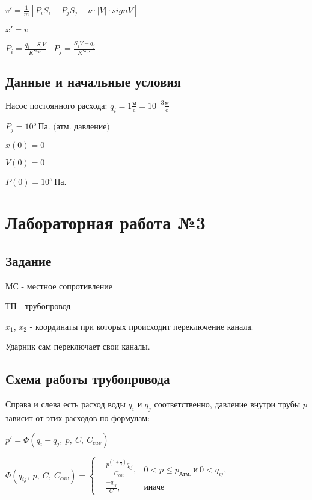 \documentclass[12pt, a4paper]{article}
\begin{document}
$ v' = \frac{1}{m}[P_i S_i - P_j S_j - \nu \cdot |V| \cdot sign V] $

$ x' = v $

$ P_i = \frac{q_i - S_i V}{K^{\text{Упр.}}} \> \> \> \> P_j = \frac{S_j V - q_j}{K^{\text{Упр.}}}$


\subsection{Данные и начальные условия}

$\text{Насос постоянного расхода: } q_i = 1 \frac{\text{м}}{\text{c}} = 10^{-3} \frac{\text{м}}{\text{c}}$

$P_j = 10^5\, \text{Па. (атм. давление)}$

$ x(0) = 0$

$ V(0) = 0$

$ P(0) = 10^5\, \text{Па.} $


\section{Лабораторная работа №3}

\subsection{Задание}

МС - местное сопротивление

ТП - трубопровод

$x_1$, $x_2$ - координаты при которых происходит переключение канала.

Ударник сам переключает свои каналы.

\subsection{Схема работы трубопровода}

Справа и слева есть расход воды $q_i$ и $q_j$ соответственно, давление внутри трубы $p$ зависит от этих расходов по формулам:

$ p' = \Phi(q_i - q_j,\ p,\ C,\ C_{cav}) $

$
\Phi(q_{ij},\ p,\ C,\ C_{cav}) = \left\{
\begin{aligned}
&\frac{p^{\left(1+\frac{1}{\gamma}\right)}q_{ij}}{C_{cav}},  & 0 < p \leqslant p_{\text{Атм.}}\ \text{и} \ 0 < q_{ij}, \\
& \frac{-q_{ij}}{C}, & \text{иначе}
\end{aligned}
\right.
$
\end{document}
